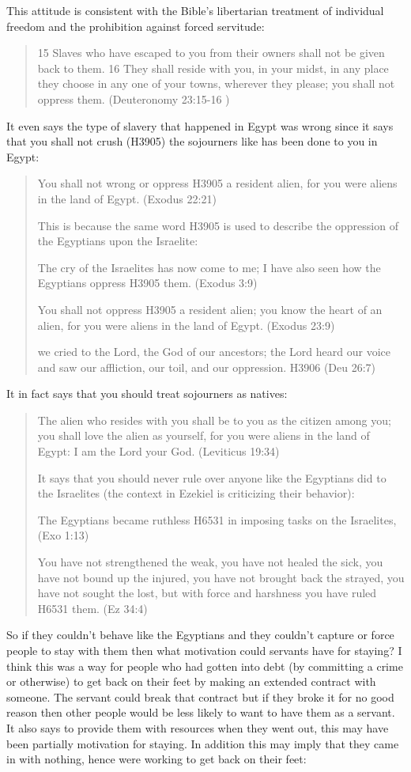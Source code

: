 \documentclass[11pt]{article}
\begin{document}
This attitude is consistent with the Bible’s libertarian treatment of individual freedom and the prohibition against forced servitude:
\begin{quote}
15 Slaves who have escaped to you from their owners shall not be given back to them. 16 They shall reside with you, in your midst, in any place they choose in any one of your towns, wherever they please; you shall not oppress them. (Deuteronomy 23:15-16 )
\end{quote}
It even says the type of slavery that happened in Egypt was wrong since it says that you shall not crush (H3905) the sojourners like has been done to you in Egypt:
\begin{quote}
You shall not wrong or oppress H3905 a resident alien, for you were aliens in the land of Egypt. (Exodus 22:21)

This is because the same word H3905 is used to describe the oppression of the Egyptians upon the Israelite:

The cry of the Israelites has now come to me; I have also seen how the Egyptians oppress H3905 them. (Exodus 3:9)

You shall not oppress H3905 a resident alien; you know the heart of an alien, for you were aliens in the land of Egypt. (Exodus 23:9)

we cried to the Lord, the God of our ancestors; the Lord heard our voice and saw our affliction, our toil, and our oppression. H3906 (Deu 26:7)
\end{quote}
It in fact says that you should treat sojourners as natives:
\begin{quote}
The alien who resides with you shall be to you as the citizen among you; you shall love the alien as yourself, for you were aliens in the land of Egypt: I am the Lord your God. (Leviticus 19:34)

It says that you should never rule over anyone like the Egyptians did to the Israelites (the context in Ezekiel is criticizing their behavior):

The Egyptians became ruthless H6531 in imposing tasks on the Israelites, (Exo 1:13)

You have not strengthened the weak, you have not healed the sick, you have not bound up the injured, you have not brought back the strayed, you have not sought the lost, but with force and harshness you have ruled H6531 them. (Ez 34:4)
\end{quote}
So if they couldn’t behave like the Egyptians and they couldn’t capture or force people to stay with them then what motivation could servants have for staying? I think this was a way for people who had gotten into debt (by committing a crime or otherwise) to get back on their feet by making an extended contract with someone. The servant could break that contract but if they broke it for no good reason then other people would be less likely to want to have them as a servant. It also says to provide them with resources when they went out, this may have been partially motivation for staying. In addition this may imply that they came in with nothing, hence were working to get back on their feet:
\end{document}
